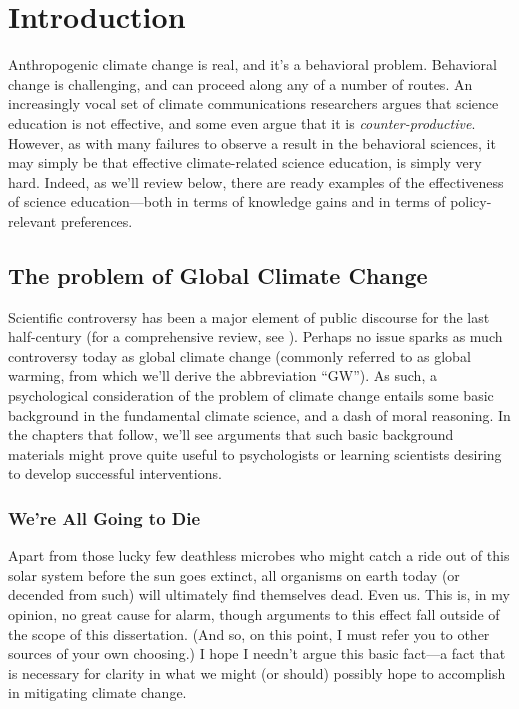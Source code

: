 \graphicspath{{intro/}}

\chapter{Introduction} \label{chap:intro}

Anthropogenic climate change is real, and it's a behavioral problem. Behavioral
change is challenging, and can proceed along any of a number of routes. An
increasingly vocal set of climate communications researchers argues that science
education is not effective, and some even argue that it is
\emph{counter-productive}.  However, as with many failures to observe a result
in the behavioral sciences, it may simply be that effective climate-related
science education, is simply very hard. Indeed, as we'll review below, there are
ready examples of the effectiveness of science education---both in terms of
knowledge gains and in terms of policy-relevant preferences. 

\section{The problem of Global Climate Change}

Scientific controversy has been a major element of public discourse for the last
half-century (for a comprehensive review, see \cite{oreskes_merchants_2010}).
Perhaps no issue sparks as much controversy today as global climate change
(commonly referred to as global warming, from which we'll derive the
abbreviation “GW”). As such, a psychological consideration of the problem of
climate change entails some basic background in the fundamental climate science,
and a dash of moral reasoning. In the chapters that follow, we'll see arguments
that such basic background materials might prove quite useful to
psychologists or learning scientists desiring to develop successful interventions.

\subsection{We're All Going to Die}

Apart from those lucky few deathless microbes who might catch a ride out of this
solar system before the sun goes extinct, all organisms on earth today (or
decended from such) will ultimately find themselves dead. Even us. This is, in
my opinion, no great cause for alarm, though arguments to this effect fall
outside of the scope of this dissertation. (And so, on this point, I must refer
you to other sources of your own choosing.) I hope I needn't argue this basic
fact---a fact that is necessary for clarity in what we might (or should)
possibly hope to accomplish in mitigating climate change.

